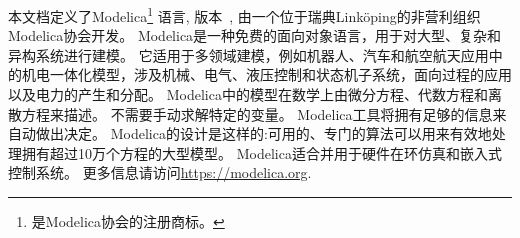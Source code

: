 \begin{center}
\large\bfseries\sffamily
\abstractname
\end{center}

本文档定义了Modelica\footnote{%
是Modelica协会的注册商标。
}
语言, 版本~\mlsversion, 由一个位于瑞典Linköping的非营利组织Modelica协会开发。
Modelica是一种免费的面向对象语言，用于对大型、复杂和异构系统进行建模。
它适用于多领域建模，例如机器人、汽车和航空航天应用中的机电一体化模型，涉及机械、电气、液压控制和状态机子系统，面向过程的应用以及电力的产生和分配。
Modelica中的模型在数学上由微分方程、代数方程和离散方程来描述。
不需要手动求解特定的变量。
Modelica工具将拥有足够的信息来自动做出决定。
Modelica的设计是这样的:可用的、专门的算法可以用来有效地处理拥有超过10万个方程的大型模型。
Modelica适合并用于硬件在环仿真和嵌入式控制系统。
更多信息请访问\url{https://modelica.org}.
